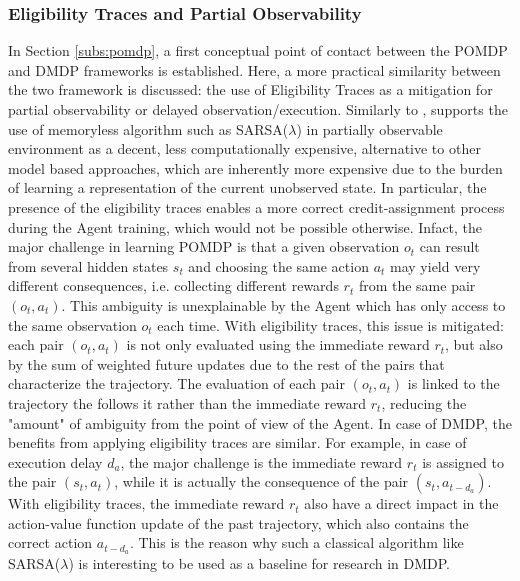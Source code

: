             \subsubsection{Eligibility Traces and Partial Observability}
                In Section \ref{subs:pomdp}, a first conceptual point of contact between the POMDP and DMDP frameworks is established. Here, a more practical similarity between the two framework is discussed: the use of Eligibility Traces as a mitigation for partial observability or delayed observation/execution. \newline
                Similarly to ,  supports the use of memoryless algorithm such as SARSA($\lambda$) in partially observable environment as a decent, less computationally expensive, alternative to other model based approaches, which are inherently more expensive due to the burden of learning a representation of the current unobserved state. In particular, the presence of the eligibility traces enables a more correct credit-assignment process during the Agent training, which would not be possible otherwise. Infact, the major challenge in learning POMDP is that a given observation $o_t$ can result from several hidden states $s_t$ and choosing the same action $a_t$ may yield very different consequences, i.e. collecting different rewards $r_t$ from the same pair $(o_t, a_t)$. This ambiguity is unexplainable by the Agent which has only access to the same observation $o_t$ each time. With eligibility traces, this issue is mitigated: each pair $(o_t, a_t)$ is not only evaluated using the immediate reward $r_t$, but also by the sum of weighted future updates due to the rest of the pairs that characterize the trajectory. The evaluation of each pair $(o_t, a_t)$ is linked to the trajectory the follows it rather than the immediate reward $r_t$, reducing the "amount" of ambiguity from the point of view of the Agent. \newline
                In case of DMDP, the benefits from applying eligibility traces are similar. For example, in case of execution delay $d_a$, the major challenge is the immediate reward $r_t$ is assigned to the pair $(s_t, a_t)$, while it is actually the consequence of the pair $(s_t, a_{t-d_a})$. With eligibility traces, the immediate reward $r_t$ also have a direct impact in the action-value function update of the past trajectory, which also contains the correct action $a_{t-d_a}$. This is the reason why such a classical algorithm like SARSA($\lambda$) is interesting to be used as a baseline for research in DMDP.
        
